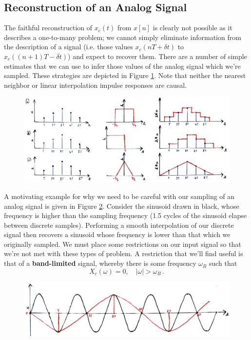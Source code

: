 \subsection{Reconstruction of an Analog Signal}
%
The faithful reconstruction of $x_c(t)$ from $x[n]$ is clearly not possible
as it describes a one-to-many problem; we cannot simply eliminate information
from the description of a signal (i.e. those values $x_c(nT + \delta t)$ to
$x_c((n+1)T - \delta t)$) and expect to recover them. There are a number of
simple estimates that we can use to infer those values of the analog signal
which we're sampled. These strategies are depicted in Figure
\ref{fig::lecture_13_interpolation_filters}. Note that neither the nearest
neighbor or linear interpolation impulse responses are causal.\\
%
\begin{figure}[!htb]
  \includegraphics[width=\textwidth]{images/lecture_13_interpolation_filters.JPG}
  \caption{
  }
  \label{fig::lecture_13_interpolation_filters}
\end{figure}
%
A motivating example for why we need to be careful with our sampling of
an analog signal is given in Figure \ref{fig::lecture_13_aliasing}. Consider the sinusoid drawn in
black, whose frequency is higher than the sampling frequency (1.5 cycles
of the sinusoid elapse between discrete samples). Performing a smooth
interpolation of our discrete signal then recovers a sinusoid whose frequency
is lower than that which we originally sampled. We must place some
restrictions on our input signal so that we're not met with these types
of problem. A restriction that we'll find useful is that of a
\textbf{band-limited} signal, whereby there is some frequency $\omega_B$
such that
%
\begin{displaymath}
  X_c(\omega) = 0,\quad |\omega| > \omega_B \,.
\end{displaymath}
%
\begin{figure}[!htb]
  \includegraphics[width=\textwidth]{images/lecture_13_aliasing.JPG}
  \caption{
  }
  \label{fig::lecture_13_aliasing}
\end{figure}
%

